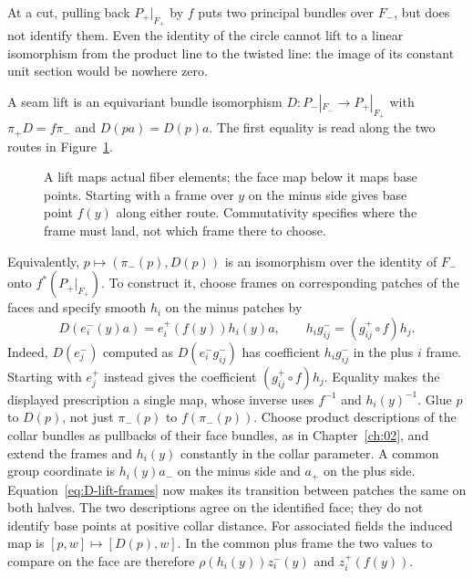 At a cut, pulling back $P_+|_{F_+}$ by $f$ puts two principal bundles over $F_-$, but does not identify them. Even the identity of the circle cannot lift to a linear isomorphism from the product line to the twisted line: the image of its constant unit section would be nowhere zero.

A seam lift is an equivariant bundle isomorphism $D:P_-|_{F_-}\to P_+|_{F_+}$ with $\pi_+D=f\pi_-$ and $D(p a)=D(p)a$. The first equality is read along the two routes in Figure~\ref{D-lift-diagram}.

\begin{figure}[htbp]\centering
{}
\caption{A lift maps actual fiber elements; the face map below it maps base points. Starting with a frame over $y$ on the minus side gives base point $f(y)$ along either route. Commutativity specifies where the frame must land, not which frame there to choose.}\label{D-lift-diagram}\end{figure}

Equivalently, $p\mapsto(\pi_-(p),D(p))$ is an isomorphism over the identity of $F_-$ onto $f^*(P_+|_{F_+})$. To construct it, choose frames on corresponding patches of the faces and specify smooth $h_i$ on the minus patches by
\begin{equation}
 D(e_i^-(y)a)=e_i^+(f(y))h_i(y)a,\qquad
 h_i g_{ij}^-=(g_{ij}^+\circ f)h_j .
 \label{eq:D-lift-frames}
\end{equation}
Indeed, $D(e_j^-)$ computed as $D(e_i^-g_{ij}^-)$ has coefficient $h_i g_{ij}^-$ in the plus $i$ frame. Starting with $e_j^+$ instead gives the coefficient $(g_{ij}^+\circ f)h_j$. Equality makes the displayed prescription a single map, whose inverse uses $f^{-1}$ and $h_i(y)^{-1}$. Glue $p$ to $D(p)$, not just $\pi_-(p)$ to $f(\pi_-(p))$. Choose product descriptions of the collar bundles as pullbacks of their face bundles, as in Chapter~\ref{ch:02}, and extend the frames and $h_i(y)$ constantly in the collar parameter. A common group coordinate is $h_i(y)a_-$ on the minus side and $a_+$ on the plus side. Equation~\eqref{eq:D-lift-frames} now makes its transition between patches the same on both halves. The two descriptions agree on the identified face; they do not identify base points at positive collar distance. For associated fields the induced map is $[p,w]\mapsto[D(p),w]$. In the common plus frame the two values to compare on the face are therefore $\rho(h_i(y))z_i^-(y)$ and $z_i^+(f(y))$.

